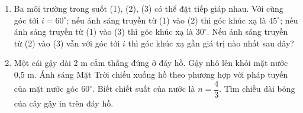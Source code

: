 \begin{enumerate}
{
	}
	\item{Ba môi trường trong suốt (1), (2), (3) có thể đặt tiếp giáp nhau. Với cùng góc tới $i = 60^\circ$; nếu ánh sáng truyền từ (1) vào (2) thì góc khúc xạ là $45^\circ$; nếu ánh sáng truyền từ (1) vào (3) thì góc khúc xạ là $30^\circ$. Nếu ánh sáng truyền từ (2) vào (3) vẫn với góc tới $i$ thì góc khúc xạ gần giá trị nào nhất sau đây?
	}
	\item{ Một cái gậy dài 2 m cắm thẳng đứng ở đáy hồ. Gậy nhô lên khỏi mặt nước 0,5 m. Ánh sáng Mặt Trời chiếu xuống hồ theo phương hợp với pháp tuyến của mặt nước góc $60^\circ$. Biết chiết suất của nước là $n = \dfrac{4}{3}$. Tìm chiều dài bóng của cây gậy in trên đáy hồ.
	} 
	

\end{enumerate}
